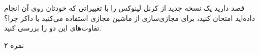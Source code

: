 
قصد دارید یک نسخه جدید از کرنل لینوکس را با تغییراتی که خودتان روی آن انجام داده‌اید امتحان کنید، برای مجازی‌سازی از ماشین مجازی استفاده می‌کنید یا داکر چرا؟ تفاوت‌های این دو را بررسی کنید.

۲ نمره
